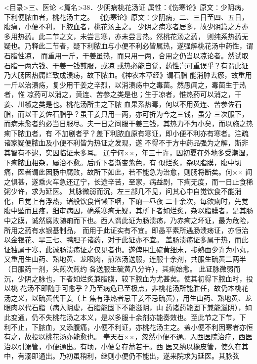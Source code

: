 \documentclass[a4paper,12pt,UTF8,twoside]{ctexbook}
\begin{document}
<目录>三、医论
<篇名>38．少阴病桃花汤证
属性：《伤寒论》原文∶少阴病，下利便脓血者，桃花汤主之。 
《伤寒论》原文∶少阴病，二、三日至四、五日，腹痛，小便不利，下脓血者，桃花汤主之。 
少阴之病寒者居多，故少阴篇之方亦多用热药。此二节之文，未尝言寒，亦未尝言热。然桃花汤之药， 
则纯系热药无疑也。乃释此二节者，疑下利脓血与小便不利必皆属热，遂强解桃花汤中药性，谓石脂性凉， 
而重用一斤，干姜虽热，而只用一两，合用之仍当以凉论者。然试取石脂一两六钱、干姜一钱煎服，或凉 
或热必能自觉，药性岂可重误乎？有谓此证乃大肠因热腐烂致成溃疡，故下脓血。《神农本草经》谓石脂 
能消肿去瘀，故重用一斤以治溃疡，复少用干姜之辛烈，以消溃疡中之毒菌。然愚闻之，毒菌生于热者，惟 
凉药可以消之，黄连、苦参之类是也；生于凉者，惟热药可以消之，干姜、川椒之类是也。桃花汤所主之下脓 
血果系热毒，何以不用黄连、苦参佐石脂，而以干姜佐石脂乎？虽干姜只用一两，亦可折为今之三钱，虽分 
三次服下，而病未愈者约必当日服尽。夫一日之间服干姜三钱，其热力不为小矣，而以施之热痢下脓血者，有 
不加剧者乎？盖下利脓血原有寒证，即小便不利亦有寒者。注疏诸家疑便脓血及小便不利皆为热证之发现，遂 
不得不于方中药品强为之解，斯非其智有不逮，实因临证未多耳。 
辽宁何××，年三十许，因初夏在外地多受潮湿，下痢脓血相杂，屡治不愈。后所下者渐变紫色，有 
似烂炙，杂以脂膜，腹中切痛，医者谓此因肠中腐败，故所下如此，若不能急为治愈，则肠将断矣。何×× 
闻之惧甚，遂乘火车急还辽宁，长途辛苦，至家，病益剧，下痢无度，而一日止食稀粥少许，求为延医。 
其脉微弱而沉，左三部几不见，问其心中自觉饮食不能消化，且觉上有浮热，诸般饮食皆懒下咽，下痢一昼夜 
二十余次，每欲痢时，先觉腹中坠而且疼，细审病因，确系寒痢无疑，其所下者如烂炙，杂以脂膜者，是其肠 
中之膜，诚然腐败随痢而下也。西人谓此证为肠溃疡，乃赤痢之坏证，最为危险，所用之药有水银基制品， 
而用于此证实有不宜。即愚平素所遇肠溃疡证，亦恒治以金银花、旱三七、鸭胆子诸药，对于此证亦不宜。 
盖肠溃疡证多属于热，而此证独属于寒，此诚肠溃疡证之仅见者也。遂俾用生硫黄细末，掺熟面少许为小丸， 
又重用生山药、熟地黄、龙眼肉，煎浓汤送服，连服十余剂，共服生硫黄二两半（日服药一剂，头煎次煎约 
各送服生硫黄八分许），其痢始愈。 
此证脉微弱而沉，少阴之脉也，下者如烂炙兼脂膜，较下脓血为尤甚矣。使其初得下脓血时，投以桃 
花汤不即随手可愈乎？乃至病危已至极点，非桃花汤所能胜任，故仍本桃花汤之义，以硫黄代干姜（上 
焦有浮热者忌干姜不忌硫黄），用生山药、熟地黄、龙眼肉以代石脂（病入阴虚，石脂能固下不能滋阴，山 
药诸药能固下兼能滋阴），如此变通，仍不失桃花汤之本义，是以多服十余剂亦能奏效也。至此节之下节，下 
利不止，下脓血，又添腹痛，小便不利证，亦桃花汤主之。盖小便不利因寒者亦恒有之，故投以桃花汤亦能愈也。 
奉天石××，忽然小便不通。入西医院治疗，西医治以引溺管，小便通出。有顷，小便复存蓄若干。西 
医又纳以橡皮管，使久在其中，有溺即通出。乃初虽稍利，继则小便仍不能出，遂来院求为延医。其脉弦 
\end{document}
